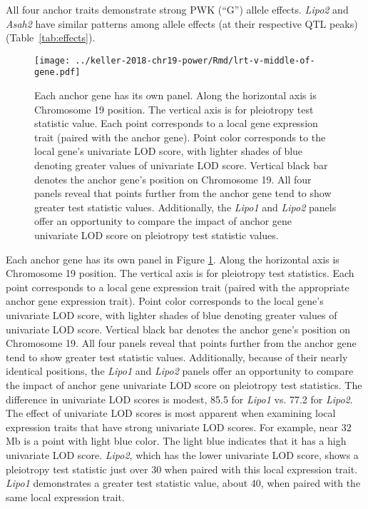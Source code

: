 \documentclass[oneside]{book}
\begin{document}
All four anchor traits demonstrate strong PWK (``G'') allele effects. 
\emph{Lipo2} and \emph{Asah2} have similar patterns among allele effects (at their respective QTL peaks) (Table~\ref{tab:effects}).



\begin{figure}
    \centering
    \texttt{[image: ../keller-2018-chr19-power/Rmd/lrt-v-middle-of-gene.pdf]}
    \caption[Pleiotropy LRT vs. chromosomal position plots reveal that higher values of pleiotropy LRT tend to correspond to greater interlocus distance and greater univariate LOD score.]{Each anchor gene has its own panel. Along the horizontal axis is Chromosome 19 position. The vertical axis is for pleiotropy test statistic value. Each point corresponds to a local gene expression trait (paired with the anchor gene). Point color corresponds to the local gene's univariate LOD score, with lighter shades of blue denoting greater values of univariate LOD score. Vertical black bar denotes the anchor gene's position on Chromosome 19. All four panels reveal that points further from the anchor gene tend to show greater test statistic values. Additionally, the \emph{Lipo1} and \emph{Lipo2} panels offer an opportunity to compare the impact of anchor gene univariate LOD score on pleiotropy test statistic values.}
    \label{fig:middle}
\end{figure}

Each anchor gene has its own panel in Figure \ref{fig:middle}. 
Along the horizontal axis is Chromosome 19 position. 
The vertical axis is for pleiotropy test statistics. 
Each point corresponds to a local gene expression trait (paired with the appropriate anchor gene expression trait). 
Point color corresponds to the local gene's univariate LOD score, with lighter shades of blue denoting greater values of univariate LOD score. 
Vertical black bar denotes the anchor gene's position on Chromosome 19. 
All four panels reveal that points further from the anchor gene tend to show greater test statistic values. 
Additionally, because of their nearly identical positions, the \emph{Lipo1} and \emph{Lipo2} panels offer an opportunity to compare the impact 
of anchor gene univariate LOD score on pleiotropy test statistics.
The difference in univariate LOD scores is modest, 85.5 for \emph{Lipo1} vs. 77.2 for \emph{Lipo2}. The effect of univariate LOD scores is most apparent when examining local expression traits that have strong univariate LOD scores. 
For example, near 32 Mb is a point with light blue color. The light blue indicates that it has a high univariate LOD score. 
\emph{Lipo2}, which has the lower univariate LOD score, shows a pleiotropy test statistic just over 30 when paired with this local expression trait. 
\emph{Lipo1} demonstrates a greater test statistic value, about 40, when paired with the same local expression trait.
\end{document}
